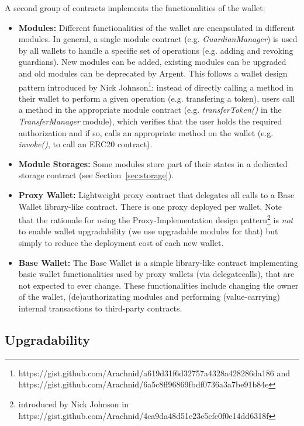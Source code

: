 \documentclass[12pt]{article}
\begin{document}
A second group of contracts implements the functionalities of the wallet:
\begin{itemize}
    \item \textbf{Modules:} Different functionalities of the wallet are encapsulated in different modules. In general, a single module contract (e.g. \emph{GuardianManager}) is used by all wallets to handle a specific set of operations (e.g. adding and revoking guardians). New modules can be added, existing modules can be upgraded and old modules can be deprecated by Argent. This follows a wallet design pattern introduced by Nick Johnson\footnote{https://gist.github.com/Arachnid/a619d31f6d32757a4328a428286da186 and https://gist.github.com/Arachnid/6a5c8ff96869fbdf0736a3a7be91b84e}: instead of directly calling a method in their wallet to perform a given operation (e.g. transfering a token), users call a method in the appropriate module contract (e.g. \emph{transferToken()} in the \emph{TransferManager} module), which  verifies that the user holds the required authorization and if so, calls an appropriate method on the wallet (e.g. \emph{invoke()}, to call an ERC20 contract).
    \item \textbf{Module Storages:} Some modules store part of their states in a dedicated storage contract (see Section~\ref{sec:storage}).
    \item \textbf{Proxy Wallet:} Lightweight proxy contract that delegates all calls to a Base Wallet library-like contract. There is one proxy deployed per wallet. Note that the rationale for using the Proxy-Implementation design pattern\footnote{ introduced by Nick Johnson in https://gist.github.com/Arachnid/4ca9da48d51e23e5cfe0f0e14dd6318f} is \emph{not} to enable wallet upgradability (we use upgradable modules for that) but simply to reduce the deployment cost of each new wallet.
    \item \textbf{Base Wallet:} The Base Wallet is a simple library-like contract implementing basic wallet functionalities used by proxy wallets (via delegatecalls), that are not expected to ever change. These functionalities include changing the owner of the wallet, (de)authorizating modules and performing (value-carrying) internal transactions to third-party contracts.
\end{itemize}

\subsection{Upgradability}
\label{sec:upgradability}
\end{document}
